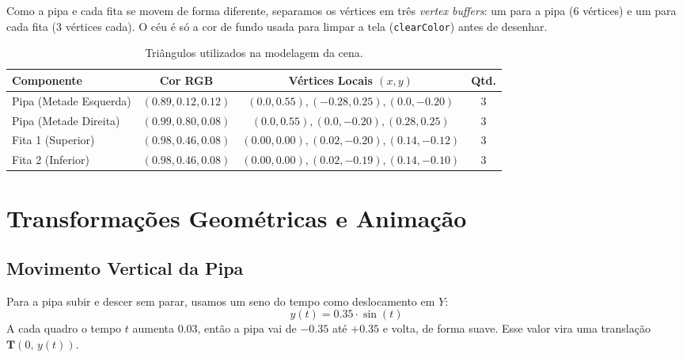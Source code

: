\documentclass[11pt,a4paper]{article}
\begin{document}
Como a pipa e cada fita se movem de forma diferente, separamos os vértices em três \textit{vertex buffers}: um para a pipa (6 vértices) e um para cada fita (3 vértices cada). O céu é só a cor de fundo usada para limpar a tela (\texttt{clearColor}) antes de desenhar.

\begin{table}[htbp]
\centering
\small
\begin{tabular}{lccc}
\toprule
\textbf{Componente} & \textbf{Cor RGB} & \textbf{Vértices Locais $(x, y)$} & \textbf{Qtd.} \\
\midrule
Pipa (Metade Esquerda) & $(0.89, 0.12, 0.12)$ & $(0.0, 0.55), (-0.28, 0.25), (0.0, -0.20)$ & 3 \\
Pipa (Metade Direita)  & $(0.99, 0.80, 0.08)$ & $(0.0, 0.55), (0.0, -0.20), (0.28, 0.25)$  & 3 \\
Fita 1 (Superior)      & $(0.98, 0.46, 0.08)$ & $(0.00, 0.00), (0.02, -0.20), (0.14, -0.12)$ & 3 \\
Fita 2 (Inferior)      & $(0.98, 0.46, 0.08)$ & $(0.00, 0.00), (0.02, -0.19), (0.14, -0.10)$ & 3 \\
\bottomrule
\end{tabular}
\caption{Triângulos utilizados na modelagem da cena.}
\label{tab:vertices}
\end{table}

\section{Transformações Geométricas e Animação}

\subsection{Movimento Vertical da Pipa}
Para a pipa subir e descer sem parar, usamos um seno do tempo como deslocamento em $Y$:
\begin{equation}
    y(t) = 0.35 \cdot \sin(t)
\end{equation}
A cada quadro o tempo $t$ aumenta $0.03$, então a pipa vai de $-0.35$ até $+0.35$ e volta, de forma suave. Esse valor vira uma translação $\mathbf{T}(0,\, y(t))$.
\end{document}
